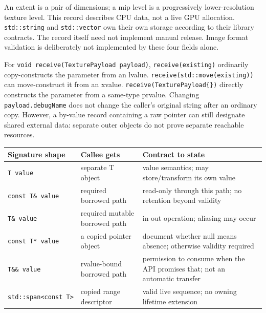An extent is a pair of dimensions; a mip level is a progressively lower-resolution texture level. This record describes CPU data, not a live GPU allocation. \texttt{std::string} and \texttt{std::vector} own their own storage according to their library contracts. The record itself need not implement manual release. Image format validation is deliberately not implemented by these four fields alone.

For \texttt{void\ receive(TexturePayload\ payload)}, \texttt{receive(existing)} ordinarily copy-constructs the parameter from an lvalue. \texttt{receive(std::move(existing))} can move-construct it from an xvalue. \texttt{receive(TexturePayload\{\})} directly constructs the parameter from a same-type prvalue. Changing \texttt{payload.debugName} does not change the caller's original string after an ordinary copy. However, a by-value record containing a raw pointer can still designate shared external data: separate outer objects do not prove separate reachable resources.

{\def\LTcaptype{none} %
\begin{longtable}[]{@{}
  >{\raggedright\arraybackslash}p{}
  >{\raggedright\arraybackslash}p{}
  >{\raggedright\arraybackslash}p{}@{}}
\toprule\noalign{}
\begin{minipage}[b]{\linewidth}\raggedright
Signature shape
\end{minipage} & \begin{minipage}[b]{\linewidth}\raggedright
Callee gets
\end{minipage} & \begin{minipage}[b]{\linewidth}\raggedright
Contract to state
\end{minipage} \\
\midrule\noalign{}
\endhead
\bottomrule\noalign{}
\endlastfoot
\texttt{T\ value} & separate T object & value semantics; may store/transform its own value \\
\texttt{const\ T\&\ value} & required borrowed path & read-only through this path; no retention beyond validity \\
\texttt{T\&\ value} & required mutable borrowed path & in-out operation; aliasing may occur \\
\texttt{const\ T*\ value} & a copied pointer object & document whether null means absence; otherwise validity required \\
\texttt{T\&\&\ value} & rvalue-bound borrowed path & permission to consume when the API promises that; not an automatic transfer \\
\texttt{std::span\textless{}const\ T\textgreater{}} & copied range descriptor & valid live sequence; no owning lifetime extension \\
\end{longtable}
}

